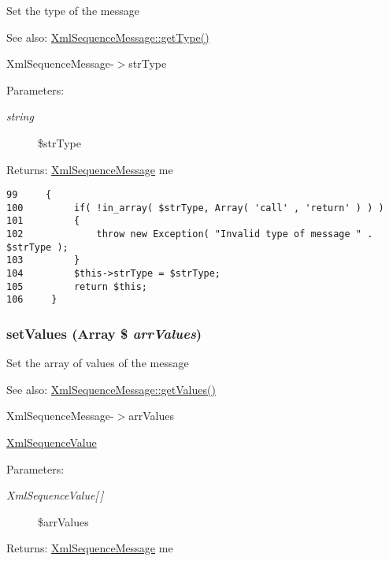 Set the type of the message

\begin{Desc}
\item[See also:]\hyperlink{class_xml_sequence_message_830b5c75df72b32396701bc563fbe3c7}{XmlSequenceMessage::getType()} 

XmlSequenceMessage-$>$strType \end{Desc}
\begin{Desc}
\item[Parameters:]
\begin{description}
\item[{\em string}]\$strType \end{description}
\end{Desc}
\begin{Desc}
\item[Returns:]\hyperlink{class_xml_sequence_message}{XmlSequenceMessage} me \end{Desc}


\begin{Code}\begin{verbatim}99     {
100         if( !in_array( $strType, Array( 'call' , 'return' ) ) )
101         {
102             throw new Exception( "Invalid type of message " . $strType );
103         }
104         $this->strType = $strType;
105         return $this;
106     }
\end{verbatim}
\end{Code}


\hypertarget{class_xml_sequence_message_18c41e77a9f42da10d074cda0ea308fe}{
\subsubsection[{setValues}]{\setlength{\rightskip}{0pt plus 5cm}setValues (Array \$ {\em arrValues})}}
\label{class_xml_sequence_message_18c41e77a9f42da10d074cda0ea308fe}


Set the array of values of the message

\begin{Desc}
\item[See also:]\hyperlink{class_xml_sequence_message_70a0fe08035189260c72e32a9e20d30c}{XmlSequenceMessage::getValues()} 

XmlSequenceMessage-$>$arrValues 

\hyperlink{class_xml_sequence_value}{XmlSequenceValue} \end{Desc}
\begin{Desc}
\item[Parameters:]
\begin{description}
\item[{\em XmlSequenceValue\mbox{[}$\,$\mbox{]}}]\$arrValues \end{description}
\end{Desc}
\begin{Desc}
\item[Returns:]\hyperlink{class_xml_sequence_message}{XmlSequenceMessage} me \end{Desc}


